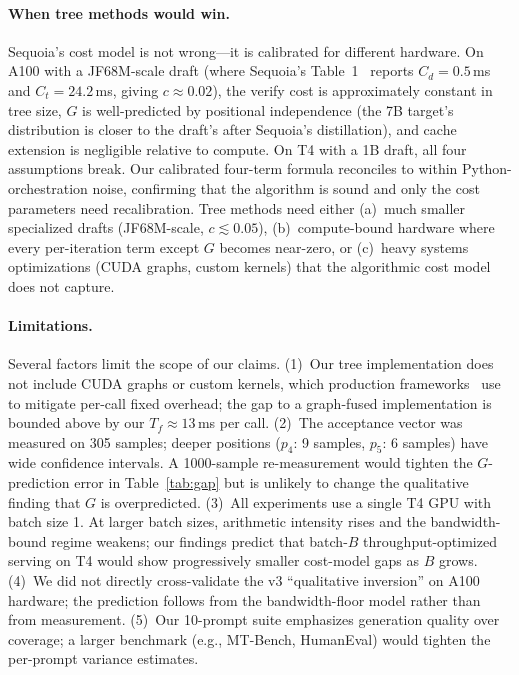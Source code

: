 \documentclass[letterpaper,twocolumn,10pt]{article}
\begin{document}
\paragraph{When tree methods would win.}
Sequoia's cost model is not wrong---it is calibrated for different hardware.
On A100 with a JF68M-scale draft (where Sequoia's Table~1~\cite{chen2024sequoia} reports $C_d = 0.5$\,ms and $C_t = 24.2$\,ms, giving $c \approx 0.02$), the verify cost is approximately constant in tree size, $G$ is well-predicted by positional independence (the 7B target's distribution is closer to the draft's after Sequoia's distillation), and cache extension is negligible relative to compute.
On T4 with a 1B draft, all four assumptions break.
Our calibrated four-term formula reconciles to within Python-orchestration noise, confirming that the algorithm is sound and only the cost parameters need recalibration.
Tree methods need either (a)~much smaller specialized drafts (JF68M-scale, $c \lesssim 0.05$), (b)~compute-bound hardware where every per-iteration term except $G$ becomes near-zero, or (c)~heavy systems optimizations (CUDA graphs, custom kernels) that the algorithmic cost model does not capture.

\paragraph{Limitations.}
Several factors limit the scope of our claims.
(1)~Our tree implementation does not include CUDA graphs or custom kernels, which production frameworks~\cite{vllm_docs,trtllm_docs} use to mitigate per-call fixed overhead; the gap to a graph-fused implementation is bounded above by our $T_f \approx 13$\,ms per call.
(2)~The acceptance vector was measured on 305 samples; deeper positions ($p_4$: 9 samples, $p_5$: 6 samples) have wide confidence intervals.
A 1000-sample re-measurement would tighten the $G$-prediction error in Table~\ref{tab:gap} but is unlikely to change the qualitative finding that $G$ is overpredicted.
(3)~All experiments use a single T4 GPU with batch size 1.
At larger batch sizes, arithmetic intensity rises and the bandwidth-bound regime weakens; our findings predict that batch-$B$ throughput-optimized serving on T4 would show progressively smaller cost-model gaps as $B$ grows.
(4)~We did not directly cross-validate the v3 ``qualitative inversion'' on A100 hardware; the prediction follows from the bandwidth-floor model rather than from measurement.
(5)~Our 10-prompt suite emphasizes generation quality over coverage; a larger benchmark (e.g., MT-Bench, HumanEval) would tighten the per-prompt variance estimates.
\end{document}
